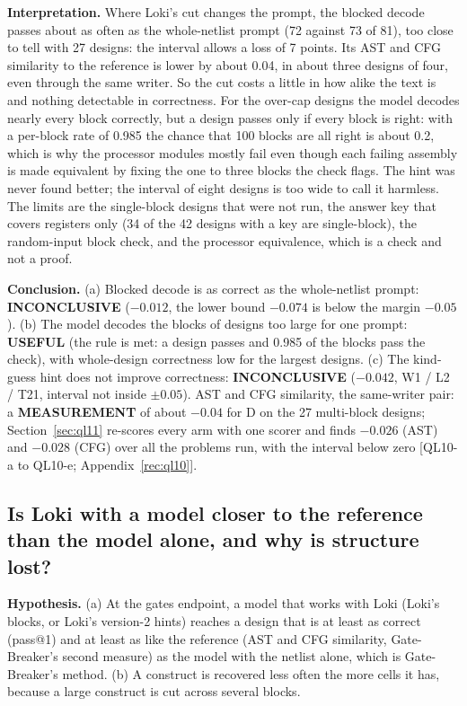 \documentclass[conference]{IEEEtran}
\newcommand{\verdict}[1]{\textbf{\textsc{#1}}}
\newcommand{\hev}[1]{\par\smallskip\noindent\textbf{#1}}
\begin{document}
\hev{Interpretation.} Where Loki's cut changes the prompt, the blocked decode passes about as often as the whole-netlist prompt (72 against 73 of 81), too close to tell with 27 designs: the interval allows a loss of 7 points. Its AST and CFG similarity to the reference is lower by about 0.04, in about three designs of four, even through the same writer. So the cut costs a little in how alike the text is and nothing detectable in correctness. For the over-cap designs the model decodes nearly every block correctly, but a design passes only if every block is right: with a per-block rate of 0.985 the chance that 100 blocks are all right is about 0.2, which is why the processor modules mostly fail even though each failing assembly is made equivalent by fixing the one to three blocks the check flags. The hint was never found better; the interval of eight designs is too wide to call it harmless. The limits are the single-block designs that were not run, the answer key that covers registers only (34 of the 42 designs with a key are single-block), the random-input block check, and the processor equivalence, which is a check and not a proof.

\hev{Conclusion.} (a) Blocked decode is as correct as the whole-netlist prompt: \verdict{INCONCLUSIVE} ($-0.012$, the lower bound $-0.074$ is below the margin $-0.05$). (b) The model decodes the blocks of designs too large for one prompt: \verdict{USEFUL} (the rule is met: a design passes and 0.985 of the blocks pass the check), with whole-design correctness low for the largest designs. (c) The kind-guess hint does not improve correctness: \verdict{INCONCLUSIVE} ($-0.042$, W1 / L2 / T21, interval not inside $\pm0.05$). AST and CFG similarity, the same-writer pair: a \verdict{MEASUREMENT} of about $-0.04$ for D on the 27 multi-block designs; Section~\ref{sec:ql11} re-scores every arm with one scorer and finds $-0.026$ (AST) and $-0.028$ (CFG) over all the problems run, with the interval below zero [QL10-a to QL10-e; Appendix~\ref{rec:ql10}].

\subsection{Is Loki with a model closer to the reference than the model alone, and why is structure lost?}
\label{arg:la6}
\label{sec:ql11}

\hev{Hypothesis.} (a) At the gates endpoint, a model that works with Loki (Loki's blocks, or Loki's version-2 hints) reaches a design that is at least as correct (pass@1) and at least as like the reference (AST and CFG similarity, Gate-Breaker's second measure) as the model with the netlist alone, which is Gate-Breaker's method. (b) A construct is recovered less often the more cells it has, because a large construct is cut across several blocks.
\end{document}
